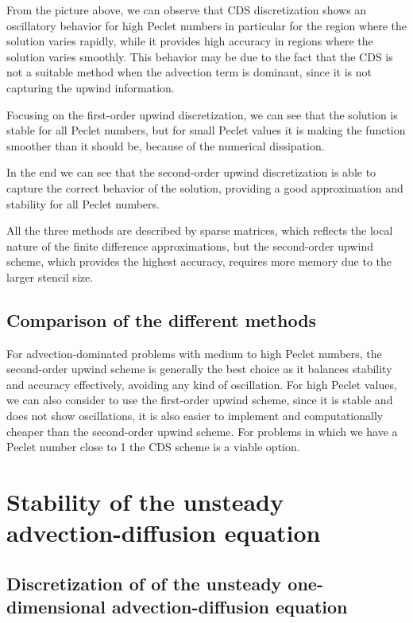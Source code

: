 \documentclass{article}
\begin{document}
From the picture above, we can observe that CDS discretization shows an oscillatory behavior for high Peclet numbers in particular for the region where the solution varies rapidly, while it provides high accuracy in regions where the solution varies smoothly.
This behavior may be due to the fact that the CDS is not a suitable method when the advection term is dominant, since it is not capturing the upwind information.

Focusing on the first-order upwind discretization, we can see that the solution is stable for all Peclet numbers, but for small Peclet values it is making the function smoother than it should be, because of the numerical dissipation.

In the end we can see that the second-order upwind discretization is able to capture the correct behavior of the solution, providing a good approximation and stability for all Peclet numbers.

All the three methods are described by sparse matrices, which reflects the local nature of the finite difference approximations, but the second-order upwind scheme, which provides the highest accuracy, requires more memory due to the larger stencil size.


\subsection{Comparison of the different methods}
For advection-dominated problems with medium to high Peclet numbers, the second-order upwind scheme is generally the best choice as it balances stability and accuracy effectively, avoiding any kind of oscillation.
For high Peclet values, we can also consider to use the first-order upwind scheme, since it is stable and does not show oscillations, it is also easier to implement and computationally cheaper than the second-order upwind scheme.
For problems in which we have a Peclet number close to 1 the CDS scheme is a viable option.



\section{Stability of the unsteady advection-diffusion equation}

\subsection{Discretization of of the unsteady one-dimensional advection-diffusion equation}
\end{document}
